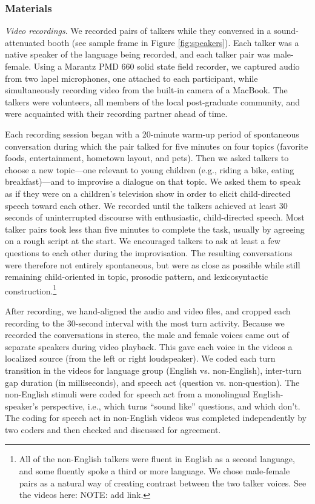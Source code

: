 \documentclass[authoryear, 12pt]{elsarticle}
\begin{document}
\subsubsection{Materials}

\textit{Video recordings}. We recorded pairs of talkers while they conversed in a sound-attenuated booth (see sample frame in Figure \ref{fig:speakers}). Each talker was a native speaker of the language being recorded, and each talker pair was male-female. Using a Marantz PMD 660 solid state field recorder, we captured audio from two lapel microphones, one attached to each participant, while simultaneously recording video from the built-in camera of a MacBook. The talkers were volunteers, all members of the local post-graduate community, and were acquainted with their recording partner ahead of time. 

Each recording session began with a 20-minute warm-up period of spontaneous conversation during which the pair talked for five minutes on four topics (favorite foods, entertainment, hometown layout, and pets). Then we asked talkers to choose a new topic---one relevant to young children (e.g., riding a bike, eating breakfast)---and to improvise a dialogue on that topic. We asked them to speak as if they were on a children's television show in order to elicit child-directed speech toward each other. We recorded until the talkers achieved at least 30 seconds of uninterrupted discourse with enthusiastic, child-directed speech. Most talker pairs took less than five minutes to complete the task, usually by agreeing on a rough script at the start. We encouraged talkers to ask at least a few questions to each other during the improvisation. The resulting conversations were therefore not entirely spontaneous, but were as close as possible while still remaining child-oriented in topic, prosodic pattern, and lexicosyntactic construction.\footnote{All of the non-English talkers were fluent in English as a second language, and some fluently spoke a third or more language. We chose male-female pairs as a natural way of creating contrast between the two talker voices. See the videos here: NOTE: add link.}

After recording, we hand-aligned the audio and video files, and cropped each recording to the 30-second interval with the most turn activity. Because we recorded the conversations in stereo, the male and female voices came out of separate speakers during video playback. This gave each voice in the videos a localized source (from the left or right loudspeaker). We coded each turn transition in the videos for language group (English vs. non-English), inter-turn gap duration (in milliseconds), and speech act (question vs. non-question). The non-English stimuli were coded for speech act from a monolingual English-speaker's perspective, i.e., which turns ``sound like'' questions, and which don't. The coding for speech act in non-English videos was completed independently by two coders and then checked and discussed for agreement.
\end{document}
